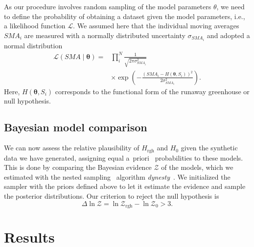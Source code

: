\documentclass[twocolumn,twocolappendix,linenumbers]{aastex631}
\begin{document}
As our procedure involves random sampling of the model parameters $\theta$, we need to define the probability of obtaining a dataset given the model parameters, i.e., a likelihood function $\mathcal{L}$.
We assumed here that the individual moving averages $SMA_i$ are measured with a normally distributed uncertainty $\sigma_{SMA_i}$ and adopted a normal distribution
\begin{eqnarray}
    \mathcal{L}(SMA \mid \boldsymbol{\theta})= & \prod_{i}^{N} \frac{1}{\sqrt{2 \pi \sigma_{SMA_i}^{2}}} \\
    & \times \exp \left(-\frac{\left(SMA_i - H\left(\boldsymbol{\theta}, S_i\right)\right)^{2}}{2 \sigma_{SMA_i}^{2}}\right).
\end{eqnarray}
Here, $H\left(\boldsymbol{\theta}, S_i\right)$ corresponds to the functional form of the runaway greenhouse or null hypothesis.


\subsection{Bayesian model comparison}
We can now assess the relative plausibility of $H_{\mathrm{rgh}}$ and $H_0$ given the synthetic data we have generated, assigning equal a~priori~ probabilities to these models.
This is done by comparing the Bayesian evidence $\mathcal{Z}$ of the models, which we estimated with the nested sampling~\citep{Skilling2004} algorithm \emph{dynesty}~\citep{Speagle2020}.
We initialized the sampler with the priors defined above to let it estimate the evidence and sample the posterior distributions.
Our criterion to reject the null hypothesis is
\begin{equation}
\Delta \ln \mathcal{Z}  = \ln \mathcal{Z}_\mathrm{rgh} - \ln \mathcal{Z}_0  > 3.
\end{equation}



\section{Results}\label{sec:results}
\end{document}
